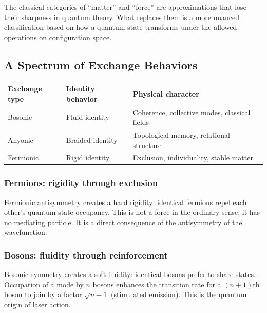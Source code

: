 \documentclass[11pt,a4paper]{article}
\begin{document}
The classical categories of ``matter'' and ``force'' are approximations that
lose their sharpness in quantum theory.  What replaces them is a more nuanced
classification based on how a quantum state transforms under the allowed
operations on configuration space.

\subsection{A Spectrum of Exchange Behaviors}

\begin{center}
\renewcommand{\arraystretch}{1.35}
\begin{tabular}{lll}
  \toprule
  Exchange type & Identity behavior & Physical character \\
  \midrule
  Bosonic         & Fluid identity     & Coherence, collective modes, classical fields \\
  Anyonic         & Braided identity   & Topological memory, relational structure \\
  Fermionic       & Rigid identity     & Exclusion, individuality, stable matter \\
  \bottomrule
\end{tabular}
\end{center}

\subsubsection{Fermions: rigidity through exclusion}

Fermionic antisymmetry creates a hard rigidity: identical fermions repel each
other's quantum-state occupancy.  This is not a force in the ordinary sense;
it has no mediating particle.  It is a direct consequence of the antisymmetry
of the wavefunction.

\subsubsection{Bosons: fluidity through reinforcement}

Bosonic symmetry creates a soft fluidity: identical bosons prefer to share
states.  Occupation of a mode by $n$ bosons enhances the transition rate for
a $(n+1)$th boson to join by a factor $\sqrt{n+1}$ (stimulated emission).
This is the quantum origin of laser action.
\end{document}
